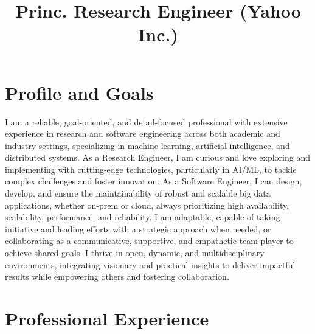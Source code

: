 \documentclass[11pt,a4paper,english, sans]{moderncv}      %
\title{Princ. Research Engineer (Yahoo Inc.)}            %
\begin{document}
\maketitle
\vspace{0.1cm}

\section{Profile and Goals}

\small I am a reliable, goal-oriented, and detail-focused professional with extensive experience in research and software engineering across both academic and industry settings, specializing in machine learning, artificial intelligence, and distributed systems. As a Research Engineer, I am curious and love exploring and implementing with cutting-edge technologies, particularly in AI/ML, to tackle complex challenges and foster innovation. As a Software Engineer, I can design, develop, and ensure the maintainability of robust and scalable big data applications, whether on-prem or cloud, always prioritizing high availability, scalability, performance, and reliability. I am adaptable, capable of taking initiative and leading efforts with a strategic approach when needed, or collaborating as a communicative, supportive, and empathetic team player to achieve shared goals. I thrive in open, dynamic, and multidisciplinary environments, integrating visionary and practical insights to deliver impactful results while empowering others and fostering collaboration.
\vspace{0.2cm}
\section{Professional Experience}

\end{document}
